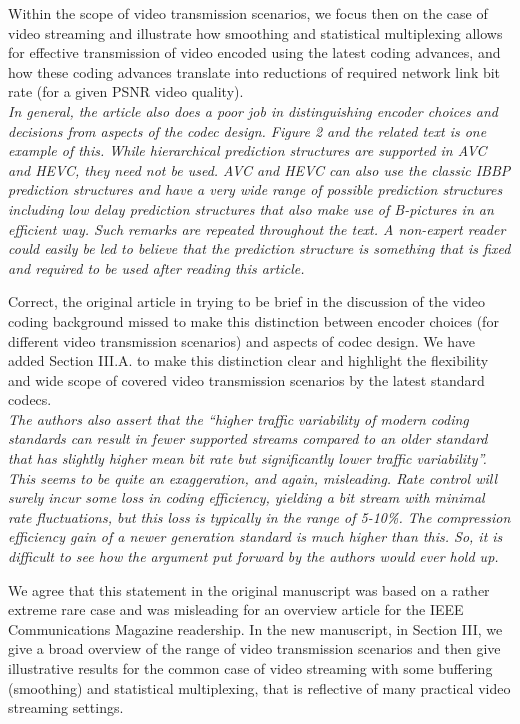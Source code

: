\documentclass[11pt, draftclsnofoot, onecolumn]{IEEEtran}
\begin{document}
{{Within the scope of video transmission scenarios, we focus then
on the case of video streaming and illustrate how smoothing
and statistical multiplexing allows for effective
transmission of video encoded using the latest coding advances, and how
these coding advances translate into reductions of required
network link bit rate (for a given PSNR video quality).\\


\noindent \textit{In general, the article also does a poor job in
  distinguishing encoder choices and decisions from aspects of the
  codec design. Figure 2 and the related text is one example of
  this. While hierarchical prediction structures are supported in AVC
  and HEVC, they need not be used. AVC and HEVC can also use the
  classic IBBP prediction structures and have a very wide range of
  possible prediction structures including low delay prediction
  structures that also make use of B-pictures in an efficient
  way. Such remarks are repeated throughout the text. A non-expert
  reader could easily be led to believe that the prediction structure
  is something that is fixed and required to be used after reading
  this article.}

Correct, the original article in trying to be brief in the discussion
of the video coding background missed to make this distinction
between encoder choices (for different video transmission scenarios)
and aspects of codec design.
We have added Section III.A. to
make this distinction clear and highlight the flexibility and wide
scope of covered video transmission scenarios by the
latest standard codecs.\\


\noindent \textit{The authors also assert that the ``higher traffic
  variability of modern coding standards can result in fewer supported
  streams compared to an older standard that has slightly higher mean
  bit rate but significantly lower traffic variability''. This seems to
  be quite an exaggeration, and again, misleading. Rate control will
  surely incur some loss in coding efficiency, yielding a bit stream
  with minimal rate fluctuations, but this loss is typically in the
  range of 5-10\%. The compression efficiency gain of a newer
  generation standard is much higher than this. So, it is difficult to
  see how the argument put forward by the authors would ever hold up.}

We agree that this statement in the original manuscript was based on
a rather extreme rare case and was misleading for an overview article
for the IEEE Communications Magazine readership.
In the new manuscript, in Section III,
we give a broad overview of the range of
video transmission scenarios and then give illustrative results
for the common case of video streaming with some buffering (smoothing)
and statistical multiplexing, that is reflective of many
practical video streaming settings. \\


}}
\end{document}
